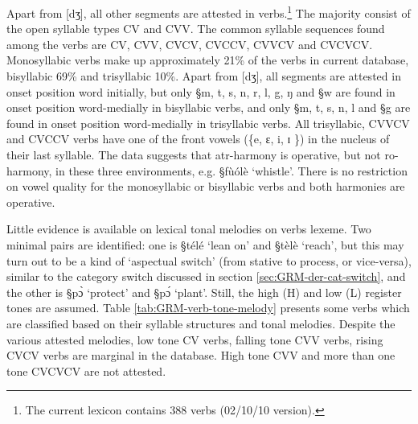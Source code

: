  Apart from [dʒ], all other segments  are attested in
verbs.\footnote{The current lexicon contains 388 verbs  (02/10/10 version).} The
majority consist of the open syllable types CV and CVV. The  common
syllable sequences found among the verbs are CV, CVV, CVCV, CVCCV,
CVVCV and CVCVCV.  Monosyllabic verbs make up approximately 21\% of the verbs in
current database, bisyllabic 69\% and trisyllabic  10\%. Apart  from [dʒ], all
segments are attested in onset position word initially, but only {\S m, t, s, n,
r, l, g, ŋ} and {\S w} are found in onset position word-medially in bisyllabic
verbs, and only {\S  m, t, s, n,  l} and {\S g} are found  in onset position
word-medially in trisyllabic verbs.   All trisyllabic, CVVCV  and CVCCV verbs
have one of the front vowels (\{e, ɛ, i, ɪ \}) in the nucleus of their last
syllable.  The data suggests that {\sc atr}-harmony is operative, but not   {\sc
ro}-harmony, in these three environments, e.g. {\S fùólè} `whistle'. 
There
is no restriction on vowel quality for the monosyllabic or bisyllabic verbs
and both harmonies are operative.


Little evidence is available on lexical tonal melodies on verbs lexeme. Two
minimal pairs are identified:  one is {\S télé} `lean on' and {\S tèlè}
`reach', but this may turn out to be a kind of `aspectual switch' (from stative
to
process, or vice-versa), similar to the category switch discussed in section
\ref{sec:GRM-der-cat-switch}, and the other is {\S pɔ̀} `protect' and  {\S pɔ́}
`plant'.  Still, the high (H) and low (L) register tones are assumed. Table
\ref{tab:GRM-verb-tone-melody} presents some verbs which are classified based on
their syllable structures and  tonal melodies.  Despite the various attested
melodies, low tone CV verbs,   falling tone CVV verbs,   rising CVCV verbs
are marginal in the database. High tone CVV and more than one tone CVCVCV are
not attested.



